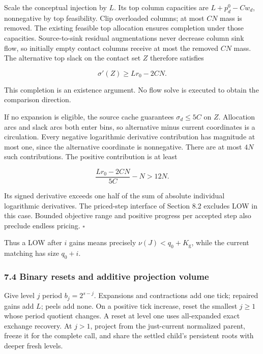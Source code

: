 Scale the conceptual injection by \(L\). Its top column capacities are \(L+p_d^0-Cw_d\), nonnegative by top feasibility. Clip overloaded columns; at most \(CN\) mass is removed. The existing feasible top allocation ensures completion under those capacities. Source-to-sink residual augmentations never decrease column sink flow, so initially empty contact columns receive at most the removed \(CN\) mass. The alternative top slack on the contact set \(Z\) therefore satisfies

\[
\sigma'(Z)\geq Lr_0-2CN.
 \tag{15}
\]

This completion is an existence argument. No flow solve is executed to obtain the comparison direction.

If no expansion is eligible, the source cache guarantees \(\sigma_d\leq5C\) on \(Z\). Allocation arcs and slack arcs both enter bins, so alternative minus current coordinates is a circulation. Every negative logarithmic derivative contribution has magnitude at most one, since the alternative coordinate is nonnegative. There are at most \(4N\) such contributions. The positive contribution is at least

\[
\frac{Lr_0-2CN}{5C}-N>12N.
 \tag{16}
\]

Its signed derivative exceeds one half of the sum of absolute individual logarithmic derivatives. The priced-step interface of Section 8.2 excludes LOW in this case. Bounded objective range and positive progress per accepted step also preclude endless pricing. \hfill\(\square\)

Thus a LOW after \(i\) gains means precisely \(\nu(J)<q_0+K_{\mathrm g}\), while the current matching has size \(q_0+i\).

\hypertarget{af-46593eb93e-binary-resets-and-additive-projection-volume}{%
\subsubsection{7.4 Binary resets and additive projection volume}\label{af-46593eb93e-binary-resets-and-additive-projection-volume}}

Give level \(j\) period \(b_j=2^{s-j}\). Expansions and contractions add one tick; repaired gains add \(L\); peels add none. On a positive tick increase, reset the smallest \(j\geq1\) whose period quotient changes. A reset at level one uses all-expanded exact exchange recovery. At \(j>1\), project from the just-current normalized parent, freeze it for the complete call, and share the settled child's persistent roots with deeper fresh levels.

